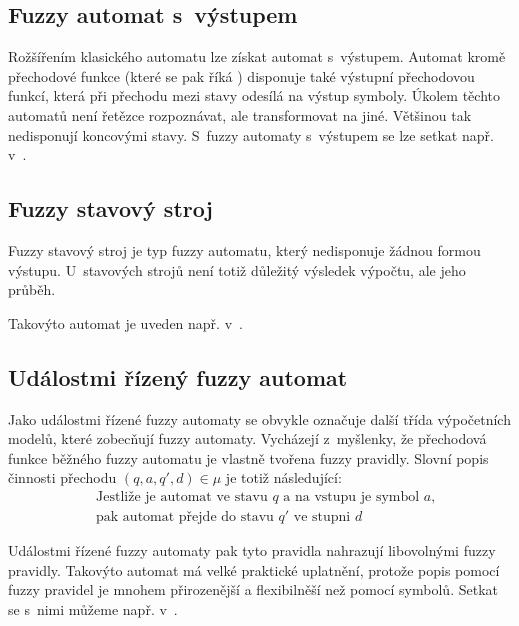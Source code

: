 \subsection{Fuzzy automat s~výstupem}
Rožšířením klasického automatu lze získat automat s~výstupem. Automat kromě přechodové funkce (které se pak říká ) disponuje také výstupní přechodovou funkcí, která při přechodu mezi stavy odesílá na výstup symboly. Úkolem těchto automatů není řetězce rozpoznávat, ale transformovat na jiné. Většinou tak nedisponují koncovými stavy. S~fuzzy automaty s~výstupem se lze setkat např. v~\cite{BlaDelPeg-FuzzAutIndUsNeuNet, PedGac-LeaFuzzAut, BlaDelPeg-FuzzGraIntUsiNeuNet, CheMo-MinAlgFuzFinAut, ThoMar-DetAccRegFuzLang}.

\subsection{Fuzzy stavový stroj}
Fuzzy stavový stroj je typ fuzzy automatu, který nedisponuje žádnou formou výstupu. U~stavových strojů není totiž důležitý výsledek výpočtu, ale jeho průběh. 

Takovýto automat je uveden např. v~\cite{Qiu-ChaFuzFinAut, AlvJoaCru-FuStMaAppEmoModEleGamCha}.

\subsection{Událostmi řízený fuzzy automat} \label{subsec:FuzzEvMach}
Jako událostmi řízené fuzzy automaty se obvykle označuje další třída výpočetních modelů, které zobecňují fuzzy automaty. Vycházejí z~myšlenky, že přechodová funkce běžného fuzzy automatu je vlastně tvořena fuzzy \ifthen pravidly. Slovní popis činnosti přechodu $(q, a, q', d) \in \mu$ je totiž následující:
\begin{align*}
 &\text{Jestliže je automat ve stavu $q$ a na vstupu je symbol $a$,} \\
 &\text{pak automat přejde do stavu $q'$ ve stupni $d$ }
\end{align*}

Událostmi řízené fuzzy automaty pak tyto pravidla nahrazují libovolnými fuzzy \ifthen pravidly. Takovýto automat má velké praktické uplatnění, protože popis pomocí fuzzy \ifthen pravidel je mnohem přirozenější a flexibilněší než pomocí symbolů. Setkat se s~nimi můžeme např. v~\cite{TriHei-ExpDesSeqFuzPer, AlvJoaCru-FuStMaAppEmoModEleGamCha, TzaRig-StaAnaAdaFuzzConSysUsiPetrNetLeaAut}.

